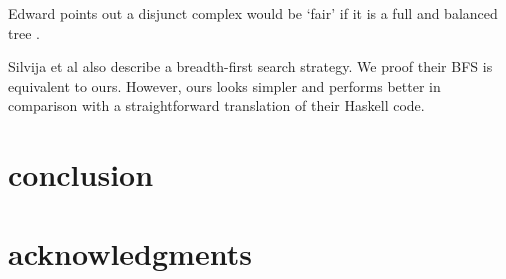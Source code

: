 \documentclass[format=acmlarge, review=true, authordraft=true]{acmart}
\begin{document}
Edward points out a disjunct complex would be `fair' if it is a full and 
balanced tree \citep{yang2010adventures}.

Silvija et al \citep{seres1999algebra} also describe a breadth-first search 
strategy. We proof their BFS is equivalent to ours. However, ours looks simpler 
and performs better in comparison with a straightforward translation of their 
Haskell code.

\section{conclusion}




\section*{acknowledgments}



\end{document}
